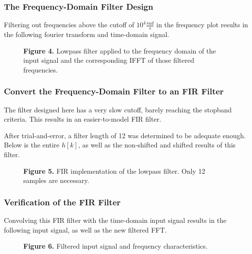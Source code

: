 \documentclass[11pt]{article}
\begin{document}
\subsubsection{The Frequency-Domain Filter Design}
Filtering out frequencies above the cutoff of $10^4 \frac{rad}{s}$ in the frequency plot results in the following fourier transform and time-domain signal.

\begin{figure}[H]
\begin{center}
\caption{\textbf{Figure 4.} Lowpass filter applied to the frequency domain of the input signal and the corresponding IFFT of those filtered frequencies.}
\end{center}
\end{figure}

\subsubsection{Convert the Frequency-Domain Filter to an FIR Filter}
The filter designed here has a very slow cutoff, barely reaching the stopband criteria. This results in an easier-to-model FIR filter.

After trial-and-error, a filter length of 12 was determined to be adequate enough. Below is the entire $h[k]$, as well as the non-shifted and shifted results of this filter.

\begin{figure}[H]
\begin{center}
\caption{\textbf{Figure 5.} FIR implementation of the lowpass filter. Only 12 samples are necessary.}
\end{center}
\end{figure}

\subsubsection{Verification of the FIR Filter}
Convolving this FIR filter with the time-domain input signal results in the following input signal, as well as the new filtered FFT.

\begin{figure}[H]
\begin{center}
\caption{\textbf{Figure 6.} Filtered input signal and frequency characteristics.}
\end{center}
\end{figure}
\end{document}
